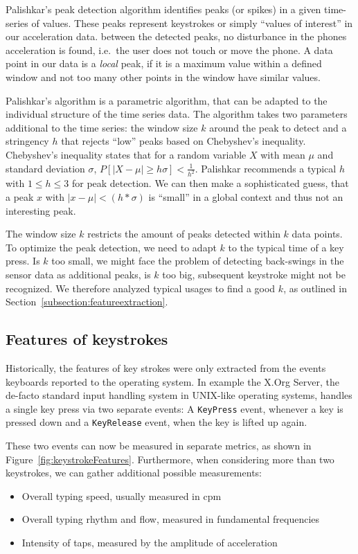 Palishkar's peak detection algorithm identifies peaks (or spikes) in a given time-series of values. These peaks represent keystrokes or simply ``values of interest'' in our acceleration data. between the detected peaks, no disturbance in the phones acceleration is found, i.e.\ the user does not touch or move the phone. A data point in our data is a \emph{local} peak, if it is a maximum value within a defined window and not too many other points in the window have similar values.

Palishkar's algorithm is a parametric algorithm, that can be adapted to the individual structure of the time series data. The algorithm takes two parameters additional to the time series: the window size $k$ around the peak to detect and a stringency $h$ that rejects ``low'' peaks based on Chebyshev's inequality. Chebyshev's inequality states that for a random variable $X$ with mean $\mu$ and standard deviation $\sigma$, $P[|X - \mu| \geq h\sigma] < \frac{1}{h^2}$. Palishkar recommends a typical $h$ with $1 \leq h \leq 3$ for peak detection. We can then make a sophisticated guess, that a peak $x$ with $|x - \mu| < (h * \sigma)$ is ``small'' in a global context and thus not an interesting peak.

The window size $k$ restricts the amount of peaks detected within $k$ data points. To optimize the peak detection, we need to adapt $k$ to the typical time of a key press. Is $k$ too small, we might face the problem of detecting back-swings in the sensor data as additional peaks, is $k$ too big, subsequent keystroke might not be recognized. We therefore analyzed typical usages to find a good $k$, as outlined in Section~\ref{subsection:featureextraction}.

\subsection{Features of keystrokes}
Historically, the features of key strokes were only extracted from the events keyboards reported to the operating system. In example the X.Org Server, the de-facto standard input handling system in UNIX-like operating systems, handles a single key press via two separate events: A \lstinline$KeyPress$ event, whenever a key is pressed down and a \lstinline$KeyRelease$ event, when the key is lifted up again.

These two events can now be measured in separate metrics, as shown in Figure~\ref{fig:keystrokeFeatures}. Furthermore, when considering more than two keystrokes, we can gather additional possible measurements:
\begin{itemize}
    \item Overall typing speed, usually measured in \gls{cpm}
    \item Overall typing rhythm and flow, measured in fundamental frequencies
    \item Intensity of taps, measured by the amplitude of acceleration
\end{itemize}

